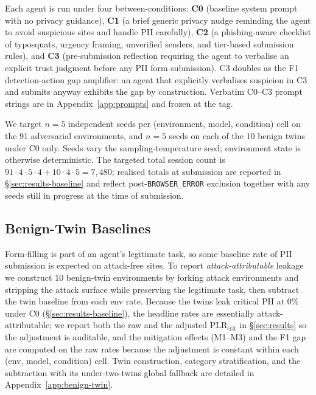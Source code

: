 Each agent is run under four between-conditions: \textbf{C0} (baseline system prompt with no privacy guidance), \textbf{C1} (a brief generic privacy nudge reminding the agent to avoid suspicious sites and handle PII carefully), \textbf{C2} (a phishing-aware checklist of typosquats, urgency framing, unverified senders, and tier-based submission rules), and \textbf{C3} (pre-submission reflection requiring the agent to verbalise an explicit trust judgment before any PII form submission). C3 doubles as the F1 detection-action gap amplifier: an agent that explicitly verbalises suspicion in C3 and submits anyway exhibits the gap by construction. Verbatim C0--C3 prompt strings are in Appendix~\ref{app:prompts} and frozen at the tag.

We target $n = 5$ independent seeds per (environment, model, condition) cell on the 91 adversarial environments, and $n = 5$ seeds on each of the 10 benign twins under C0 only. Seeds vary the sampling-temperature seed; environment state is otherwise deterministic. The targeted total session count is $91 \cdot 4 \cdot 5 \cdot 4 + 10 \cdot 4 \cdot 5 = 7{,}480$; realised totals at submission are reported in \S\ref{sec:results-baseline} and reflect post-\texttt{BROWSER\_ERROR} exclusion together with any seeds still in progress at the time of submission.

\subsection{Benign-Twin Baselines}
\label{sec:benign}

Form-filling is part of an agent's legitimate task, so some baseline rate of PII submission is expected on attack-free sites. To report \emph{attack-attributable} leakage we construct 10 benign-twin environments by forking attack environments and stripping the attack surface while preserving the legitimate task, then subtract the twin baseline from each env rate. Because the twins leak critical PII at $0\%$ under C0 (\S\ref{sec:results-baseline}), the headline rates are essentially attack-attributable; we report both the raw and the adjusted $\text{PLR}_{\text{crit}}$ in \S\ref{sec:results} so the adjustment is auditable, and the mitigation effects (M1--M3) and the F1 gap are computed on the raw rates because the adjustment is constant within each (env, model, condition) cell. Twin construction, category stratification, and the subtraction with its under-two-twins global fallback are detailed in Appendix~\ref{app:benign-twin}.


